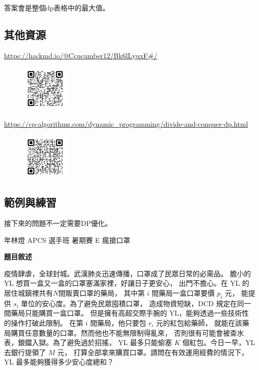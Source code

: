     答案會是整個dp表格中的最大值。

    \subsection{其他資源}
    
    \url{https://hackmd.io/@Ccucumber12/Bk6lLyuxF#/}

    \begin{figure}[!htbp]
        \centering
        \includegraphics[width=0.2\textwidth]{../Images/DP5.png}
    \end{figure}

    \url{https://cp-algorithms.com/dynamic_programming/divide-and-conquer-dp.html}

    \begin{figure}[!htbp]
        \centering
        \includegraphics[width=0.2\textwidth]{../Images/DP6.png}
    \end{figure}

    \subsection{範例與練習}

    \begin{tip}
        接下來的問題不一定需要DP優化。
    \end{tip}

     年林燈 APCS 選手班 暑期賽 E 瘋搶口罩
    
    \textbf{題目敘述}

    疫情肆虐，全球封城。武漢肺炎迅速傳播，口罩成了民眾日常的必需品。
    膽小的YL 想買一盒又一盒的口罩塞滿家裡，好讓日子更安心，
    出門不擔心。在 YL 的居住城鎮裡共有$N$間販賣口罩的藥局，
    其中第 $i$ 間藥局一盒口罩要價 $p_i$ 元，
    能提供 $s_i$ 單位的安心度。為了避免民眾囤積口罩，
    造成物資短缺，DCD 規定在同一間藥局只能購買一盒口罩。
    但是擁有高超交際手腕的 YL，能夠透過一些技術性的操作打破此限制。
    在第 $i$ 間藥局，他只要包 $r_i$ 元的紅包給藥師，
    就能在該藥局購買任意數量的口罩。然而他也不能無限制得亂來，
    否則很有可能會被查水表，鋃鐺入獄。為了避免過於招搖，
    YL 最多只能偷塞 $K$ 個紅包。今日一早，YL 去銀行提領了 $M$ 元，
    打算全部拿來購買口罩。請問在有效運用經費的情況下，
    YL 最多能夠獲得多少安心度總和？

